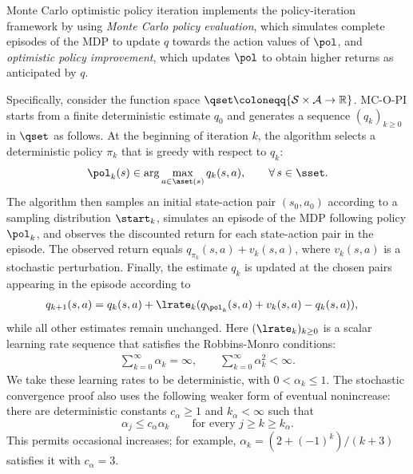 Monte Carlo optimistic policy iteration implements the policy-iteration framework by using 
\textit{Monte Carlo policy evaluation}, which simulates complete episodes of the MDP to update $q$ towards the action values of $\pol$,
and \textit{optimistic policy improvement}, which updates $\pol$ to obtain higher returns as anticipated by $q$.

Specifically, consider the function space $\qset \coloneqq \{ \mathcal S \times \mathcal A \to \mathbb R \}$.
MC-O-PI starts from a finite deterministic estimate $q_0$ and generates a sequence $(q_k)_{k \ge 0}$ in $\qset$ as follows.
At the beginning of iteration $k$, the algorithm selects a deterministic policy $\pi_k$ that is greedy with respect to $q_k$:
\begin{align}
\label{eq: greedy policy definition}
    \pol_k(s) \in \arg\max_{a \in \aset(s)} q_k(s,a),
    \qquad \forall \, s \in \sset .
\end{align}
The algorithm then samples an initial state-action pair $(s_0, a_0)$ according to a sampling distribution $\start_k$,
simulates an episode of the MDP following policy $\pol_k$, and observes the discounted return for each state-action pair in the episode.
The observed return equals $q_{\pi_k}(s,a) + v_k(s,a)$, where $v_k(s,a)$ is a stochastic perturbation.
Finally, the estimate $q_k$ is updated at the chosen pairs appearing in the episode
according to
\begin{align}
\label{eq: MC eval update}
    q_{k+1}(s, a)
    &= q_k(s,a) +  \lrate_k( q_{\pol_k}(s, a) + v_k(s, a) - q_k(s,a) ) ,
\end{align}
while all other estimates remain unchanged. Here $(\lrate_k)_{k \ge 0}$ is a scalar learning rate sequence that satisfies the Robbins-Monro conditions:
\begin{align}
 \label{eq: robbins monro conditions}
    \sum_{k =0}^\infty \alpha_k = \infty ,
    \qquad
    \sum_{k =0}^\infty \alpha_k^2 < \infty .
\end{align}
We take these learning rates to be deterministic, with $0<\alpha_k\le1$. The stochastic convergence proof also uses the following weaker form of eventual nonincrease: there are deterministic constants $c_\alpha\ge1$ and $k_\alpha<\infty$ such that
\begin{equation}
\label{eq:comparison}
\alpha_j\le c_\alpha\alpha_k\qquad\text{for every }j\ge k\ge k_\alpha.
\end{equation}
This permits occasional increases; for example, $\alpha_k=(2+(-1)^k)/(k+3)$ satisfies it with $c_\alpha=3$.

